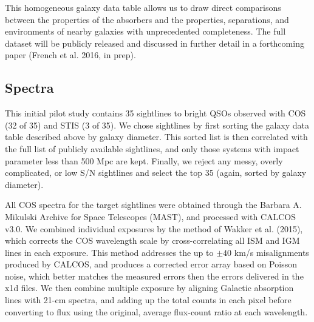 \documentclass[iop]{emulateapj-rtx4}
\begin{document}
This homogeneous galaxy data table allows us to draw direct comparisons between the properties of the absorbers and the properties, separations, and environments of nearby galaxies with unprecedented completeness. The full dataset will be publicly released and discussed in further detail in a forthcoming paper (French et al. 2016, in prep).


\subsection{Spectra}

This initial pilot study contains 35 sightlines to bright QSOs observed with COS (32 of 35) and STIS (3 of 35). We chose sightlines by first sorting the galaxy data table described above by galaxy diameter. This sorted list is then correlated with the full list of publicly available sightlines, and only those systems with impact parameter less than 500 Mpc are kept. Finally, we reject any messy, overly complicated, or low S/N sightlines and select the top 35 (again, sorted by galaxy diameter).


All COS spectra for the target sightlines were obtained through the Barbara A. Mikulski Archive for Space Telescopes (MAST), and processed with CALCOS v3.0. We combined individual exposures by the method of Wakker et al. (2015), which corrects the COS wavelength scale by cross-correlating all ISM and IGM lines in each exposure. This method addresses the up to $\pm40$ km/s misalignments produced by CALCOS, and produces a corrected error array based on Poisson noise, which better matches the measured errors then the errors delivered in the x1d files. We then combine multiple exposure by aligning Galactic absorption lines with 21-cm spectra, and adding up the total counts in each pixel before converting to flux using the original, average flux-count ratio at each wavelength.
\end{document}
